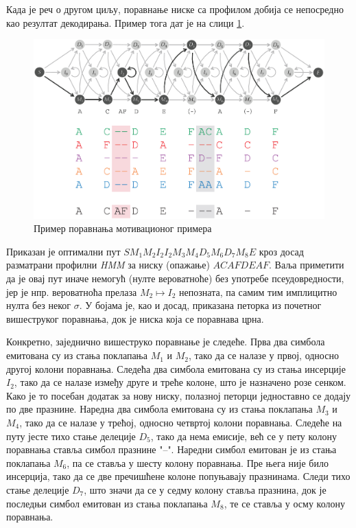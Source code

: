 \documentclass[12pt,oneside]{memoir}
\begin{document}
\begin{CJK}{UTF8}{ipxm}
Када је реч о другом циљу, поравнање ниске са профилом добија се непосредно као резултат декодирања. Пример тога дат је на слици \ref{fig:poravnanje}.

\begin{figure}[H]
  \centering
  \includegraphics[width=\textwidth]{poravnanje.png}
  \caption{Пример поравнања мотивационог примера \cite{compeau2015}}
  \label{fig:poravnanje}
\end{figure}

Приказан је оптимални пут $S M_1 M_2 I_2 I_2 M_3 M_4 D_5 M_6 D_7 M_8 E$ кроз досад разматрани профилни \textit{HMM} за ниску (опажање) $ACAFDEAF$. Ваља приметити да је овај пут иначе немогућ (нулте вероватноће) без употребе псеудовредности, јер је нпр. вероватноћа прелаза $M_2 \mapsto I_2$ непозната, па самим тим имплицитно нулта без неког $\sigma$. У бојама је, као и досад, приказана петорка из почетног вишеструког поравнања, док је ниска која се поравнава црна.

Конкретно, заједнично вишеструко поравнање је следеће. Прва два симбола емитована су из стања поклапања $M_1$ и $M_2$, тако да се налазе у првој, односно другој колони поравнања. Следећа два симбола емитована су из стања инсерције $I_2$, тако да се налазе између друге и треће колоне, што је назначено розе сенком. Како је то посебан додатак за нову ниску, полазној петорци једноставно се додају по две празнине. Наредна два симбола емитована су из стања поклапања $M_3$ и $M_4$, тако да се налазе у трећој, односно четвртој колони поравнања. Следеће на путу јесте тихо стање делеције $D_5$, тако да нема емисије, већ се у пету колону поравнања ставља симбол празнине "--". Наредни симбол емитован је из стања поклапања $M_6$, па се ставља у шесту колону поравнања. Пре њега није било инсерција, тако да се две пречишћене колоне попуњавају празнинама. Следи тихо стање делеције $D_7$, што значи да се у седму колону ставља празнина, док је последњи симбол емитован из стања поклапања $M_8$, те се ставља у осму колону поравнања.


\end{CJK}
\end{document}
